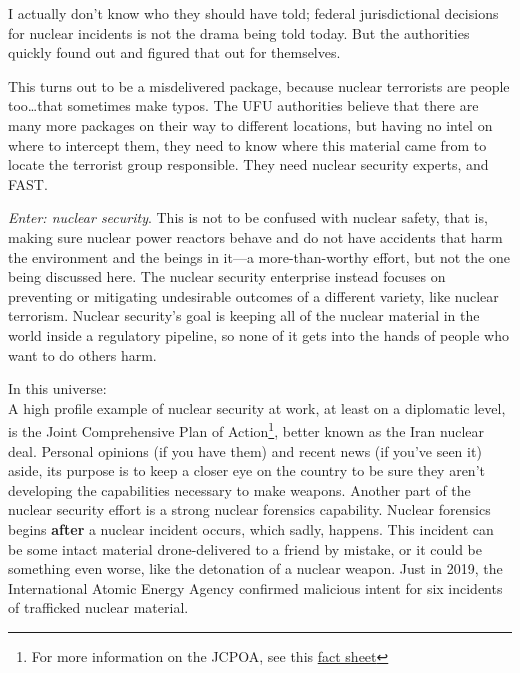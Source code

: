 {\narr I actually don't know who they should have told; federal jurisdictional
decisions for nuclear incidents is not the drama being told today. But the
authorities quickly found out and figured that out for themselves.

\begin{shadequote} 

  This turns out to be a misdelivered package, because nuclear terrorists are
  people too\ldots that sometimes make typos. The UFU authorities believe that
  there are many more packages on their way to different locations, but having
  no intel on where to intercept them, they need to know where this material
  came from to locate the terrorist group responsible. They need nuclear
  security experts, and FAST.

\end{shadequote}

\narr \textit{Enter: nuclear security}. This is not to be confused with nuclear
safety, that is, making sure nuclear power reactors behave and do not have
accidents that harm the environment and the beings in it---a more-than-worthy
effort, but not the one being discussed here. The nuclear security enterprise
instead focuses on preventing or mitigating undesirable outcomes of a different
variety, like nuclear terrorism. Nuclear security's goal is keeping all of the
nuclear material in the world inside a regulatory pipeline, so none of it gets
into the hands of people who want to do others harm.

\noindent In this universe:\\ A high profile example of nuclear security at
work, at least on a diplomatic level, is the Joint Comprehensive Plan of
Action\footnote{For more information on the JCPOA, see this
\href{https://www.armscontrol.org/factsheets/JCPOA-at-a-glance}{\color{violet}fact
sheet}}, better known as the Iran nuclear deal. Personal opinions (if you have
them) and recent news (if you've seen it) aside, its purpose is to keep a
closer eye on the country to be sure they aren't developing the capabilities
necessary to make weapons.  Another part of the nuclear security effort is a
strong nuclear forensics capability.  Nuclear forensics begins \textbf{after} a
nuclear incident occurs, which sadly, happens. This incident can be some intact
material drone-delivered to a friend by mistake, or it could be something even
worse, like the detonation of a nuclear weapon. Just in 2019, the International
Atomic Energy Agency confirmed malicious intent for six incidents of trafficked
nuclear material.

}
